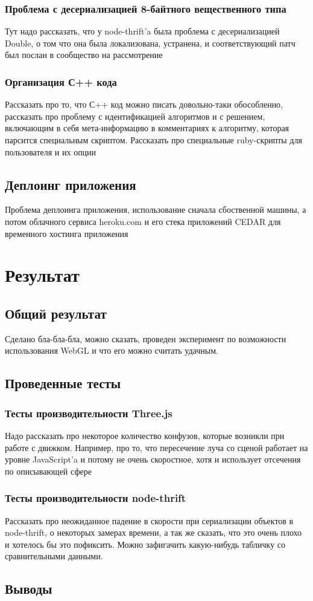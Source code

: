\documentclass[12pt, a4paper]{article}
\let\stdsection\section
\renewcommand\section{\newpage\stdsection}
\begin{document}
\subsubsection{Проблема с десериализацией 8-байтного вещественного типа}
Тут надо рассказать, что у node-thrift'a была проблема с десериализацией Double,
о том что она была локализована, устранена, и соответствующий патч был послан в
сообщество на рассмотрение
\subsubsection{Организация С++ кода}
Рассказать про то, что С++ код можно писать довольно-таки обособленно,
рассказать про проблему с идентификацией алгоритмов и с решением, включающим в
себя мета-информацию в комментариях к алгоритму, которая парсится специальным
скриптом. Рассказать про специальные ruby-скрипты для пользователя и их опции

\subsection{Деплоинг приложения}
Проблема деплоинга приложения, использование сначала сбоственной машины, а потом
облачного сервиса heroku.com и его стека приложений CEDAR для временного
хостинга приложения


\section{Результат}
\subsection{Общий результат}
Сделано бла-бла-бла, можно сказать, проведен эксперимент по возможности
использования WebGL и что его можно считать удачным.
\subsection{Проведенные тесты}
\subsubsection{Тесты производительности Three.js}
Надо рассказать про некоторое количество конфузов, которые возникли при работе
с движком. Например, про то, что пересечение луча со сценой работает на уровне
JavaScript'a и потому не очень скоростное, хотя и использует отсечения по
описывающей сфере
\subsubsection{Тесты производительности node-thrift}
Рассказать про неожиданное падение в скорости при сериализации объектов в
node-thrift, о некоторых замерах времени, а так же сказать, что это очень плохо
и хотелось бы это пофиксить. Можно зафигачить какую-нибудь табличку со
сравнительными данными.
\subsection{Выводы}
\end{document}
